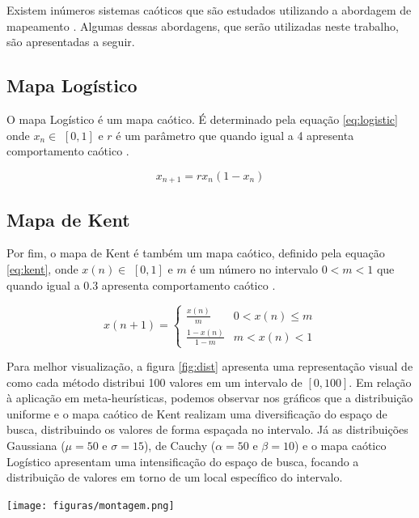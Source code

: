 Existem inúmeros sistemas caóticos que são estudados utilizando a abordagem de mapeamento \cite{cattani}. Algumas dessas abordagens, que serão utilizadas neste trabalho, são apresentadas a seguir.

\subsection{Mapa Logístico}
O mapa Logístico é um mapa caótico. É determinado pela equação \ref{eq:logistic} onde $x_{n} \in$ $[0, 1]$ e $r$ é um parâmetro que quando igual a 4 apresenta comportamento caótico \cite{fister}.

\begin{equation}
\label{eq:logistic}
x_{n + 1} = r x_{n} (1 - x_{n})
\end{equation}

\subsection{Mapa de Kent}
Por fim, o mapa de Kent é também um mapa caótico, definido pela equação \ref{eq:kent}, onde $x(n) \in$ $[0, 1]$ e $m$ é um número no intervalo $0 < m < 1$ que quando igual a 0.3 apresenta comportamento caótico \cite{fister}. 

\begin{equation}
\label{eq:kent}
x(n + 1) = 
\begin{cases}
	\frac{x(n)}{m}    & \text{$0 < x(n) \leq m$}\\
    \frac{1 - x(n)}{1 - m} & \text{$m < x(n) < 1$}
\end{cases}
\end{equation}

Para melhor visualização, a figura \ref{fig:dist} apresenta uma representação visual de como cada método distribui 100 valores em um intervalo de $[0, 100]$. Em relação à aplicação em meta-heurísticas, podemos observar nos gráficos que a distribuição uniforme e o mapa caótico de Kent realizam uma diversificação do espaço de busca, distribuindo os valores de forma espaçada no intervalo. Já as distribuições Gaussiana ($\mu = 50$ e $\sigma = 15$), de Cauchy ($\alpha = 50$ e $\beta = 10$) e o mapa caótico Logístico apresentam uma intensificação do espaço de busca, focando a distribuição de valores em torno de um local específico do intervalo.

{
    \centering
    \texttt{[image: figuras/montagem.png]}
    \label{fig:dist}
}

